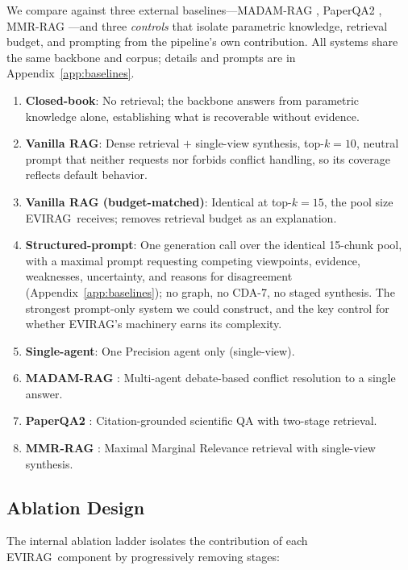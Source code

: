 \documentclass[11pt]{article}
\newcommand{\system}{\textsc{EVIRAG}\xspace}
\begin{document}
We compare against three external baselines---MADAM-RAG
\citep{wang2025conflicting}, PaperQA2 \citep{skarlinski2024paperqa2}, MMR-RAG
\citep{carbonell1998mmr}---and three \emph{controls} that isolate parametric
knowledge, retrieval budget, and prompting from the pipeline's own
contribution.  All systems share the same backbone and corpus; details and
prompts are in Appendix~\ref{app:baselines}.

\begin{enumerate}[leftmargin=*,nosep,label=\arabic{enumi}.]
  \item \textbf{Closed-book}: No retrieval; the backbone answers from
    parametric knowledge alone, establishing what is recoverable without
    evidence.
  \item \textbf{Vanilla RAG}: Dense retrieval $+$ single-view synthesis,
    top-$k{=}10$, neutral prompt that neither requests nor forbids conflict
    handling, so its coverage reflects default behavior.
  \item \textbf{Vanilla RAG (budget-matched)}: Identical at top-$k{=}15$, the
    pool size \system\ receives; removes retrieval budget as an explanation.
  \item \textbf{Structured-prompt}: One generation call over the identical
    15-chunk pool, with a maximal prompt requesting competing viewpoints,
    evidence, weaknesses, uncertainty, and reasons for disagreement
    (Appendix~\ref{app:baselines}); no graph, no CDA-7, no staged synthesis.
    The strongest prompt-only system we could construct, and the key control
    for whether \system's machinery earns its complexity.
  \item \textbf{Single-agent}: One Precision agent only (single-view).
  \item \textbf{MADAM-RAG} \citep{wang2025conflicting}: Multi-agent
    debate-based conflict resolution to a single answer.
  \item \textbf{PaperQA2} \citep{skarlinski2024paperqa2}: Citation-grounded
    scientific QA with two-stage retrieval.
  \item \textbf{MMR-RAG} \citep{carbonell1998mmr}: Maximal Marginal
    Relevance retrieval with single-view synthesis.
\end{enumerate}

\subsection{Ablation Design}
\label{sec:ablation}

The internal ablation ladder isolates the contribution of each \system\
component by progressively removing stages:
\end{document}

